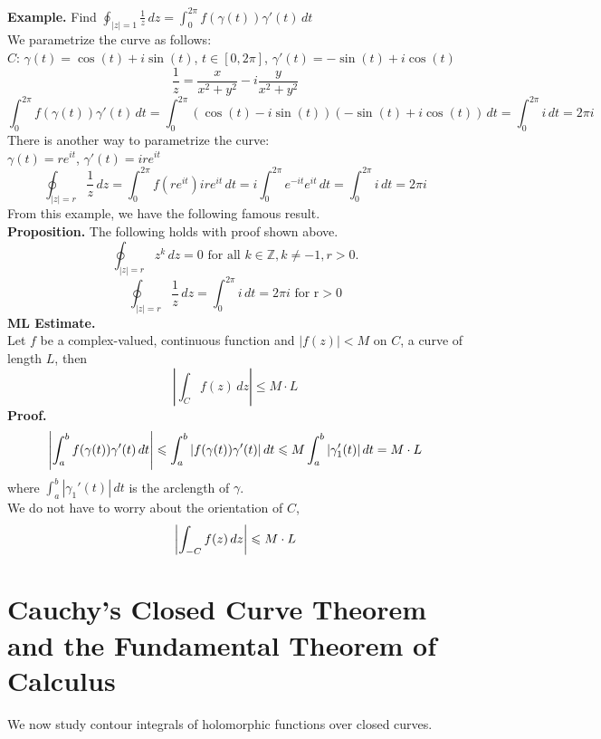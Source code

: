 \documentclass[11pt]{article}
\DeclarePairedDelimiter\abs{\lvert}{\rvert}
\begin{document}
\textbf{Example.} Find $\oint_{|z| = 1} \frac{1}{z} \,dz = \int_{0}^{2\pi} f(\gamma(t))\gamma'(t) \,dt$ \\
We parametrize the curve as follows: \\
$C$: $\gamma(t) = \cos(t) + i\sin(t)$, $t \in [0, 2\pi]$,  $\gamma'(t) = -\sin(t) + i\cos(t)$ \\
$$\frac{1}{z} = \frac{x}{x^2 + y^2} - i\frac{y}{x^2 + y^2}$$
$$\int_0^{2\pi}f(\gamma(t))\gamma'(t) \,dt = \int_0^{2\pi}(\cos(t) - i\sin(t))(-\sin(t) + i\cos(t)) \,dt = \int_0^{2\pi}i \,dt = 2\pi i$$
There is another way to parametrize the curve: \\
$\gamma(t) = re^{it}$, $\gamma'(t) = ire^{it}$
$$\oint_{|z| = r} \frac{1}{z} \,dz = \int_0^{2\pi} f(re^{it})ire^{it} \,dt = i\int_0^{2\pi}e^{-it}e^{it} \,dt = \int_0^{2\pi}i \,dt = 2\pi i$$
From this example, we have the following famous result. \\
\newline
\textbf{Proposition.} The following holds with proof shown above.
\begin{equation*} 
\oint_{|z| = r} z^k \,dz = 0 \mbox{ for all } k \in \mathbb{Z}, k \neq -1, r > 0. 
\end{equation*}
\begin{equation*}
\oint_{|z| = r} \frac{1}{z} \,dz = \int_0^{2\pi} i \,dt = 2\pi i \mbox{ for r} > 0 
\end{equation*}
\newline
\textbf{ML Estimate.} \\
Let $f$ be a complex-valued, continuous function and $|f(z)| < M$ on $C$, a curve of length $L$, then 
$$|\int_Cf(z) \,dz| \leqslant M \cdot L$$
\textbf{Proof.}
$$ \abs*{\int_a^b f(\gamma(t))\gamma'(t) \,dt} \leqslant \int_a^b|f(\gamma(t))\gamma'(t)| \,dt \leqslant M\int_a^b|\gamma_1'(t)| \,dt = M \cdot L$$
where $\int_a^b|\gamma_1'(t)| \,dt$ is the arclength of $\gamma$. \\
We do not have to worry about the orientation of $C$, 
$$ \abs*{\int_{-C}f(z) \,dz} \leqslant M \cdot L$$
\newpage

\section{Cauchy's Closed Curve Theorem and the Fundamental Theorem of Calculus}
We now study contour integrals of holomorphic functions over closed curves. 
\end{document}
